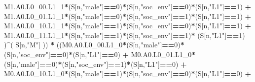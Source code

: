 \documentclass[
]{book}
\newenvironment{Shaded}{\begin{snugshade}}{\end{snugshade}}
\newcommand{\DecValTok}[1]{\textcolor[rgb]{0.00,0.00,0.81}{#1}}
\newcommand{\NormalTok}[1]{#1}
\newcommand{\SpecialCharTok}[1]{\textcolor[rgb]{0.81,0.36,0.00}{\textbf{#1}}}
\newcommand{\StringTok}[1]{\textcolor[rgb]{0.31,0.60,0.02}{#1}}
\begin{document}
\begin{Shaded}
\begin{Highlighting}[]
\NormalTok{          M1.A0.L0\_00.L1\_1}\SpecialCharTok{*}\NormalTok{(S[n,}\StringTok{"male"}\NormalTok{]}\SpecialCharTok{==}\DecValTok{0}\NormalTok{)}\SpecialCharTok{*}\NormalTok{(S[n,}\StringTok{"soc\_env"}\NormalTok{]}\SpecialCharTok{==}\DecValTok{0}\NormalTok{)}\SpecialCharTok{*}\NormalTok{(S[n,}\StringTok{"L1"}\NormalTok{]}\SpecialCharTok{==}\DecValTok{1}\NormalTok{) }\SpecialCharTok{+}
\NormalTok{          M1.A0.L0\_01.L1\_1}\SpecialCharTok{*}\NormalTok{(S[n,}\StringTok{"male"}\NormalTok{]}\SpecialCharTok{==}\DecValTok{0}\NormalTok{)}\SpecialCharTok{*}\NormalTok{(S[n,}\StringTok{"soc\_env"}\NormalTok{]}\SpecialCharTok{==}\DecValTok{1}\NormalTok{)}\SpecialCharTok{*}\NormalTok{(S[n,}\StringTok{"L1"}\NormalTok{]}\SpecialCharTok{==}\DecValTok{1}\NormalTok{) }\SpecialCharTok{+}
\NormalTok{          M1.A0.L0\_10.L1\_1}\SpecialCharTok{*}\NormalTok{(S[n,}\StringTok{"male"}\NormalTok{]}\SpecialCharTok{==}\DecValTok{1}\NormalTok{)}\SpecialCharTok{*}\NormalTok{(S[n,}\StringTok{"soc\_env"}\NormalTok{]}\SpecialCharTok{==}\DecValTok{0}\NormalTok{)}\SpecialCharTok{*}\NormalTok{(S[n,}\StringTok{"L1"}\NormalTok{]}\SpecialCharTok{==}\DecValTok{1}\NormalTok{) }\SpecialCharTok{+}
\NormalTok{          M1.A0.L0\_11.L1\_1}\SpecialCharTok{*}\NormalTok{(S[n,}\StringTok{"male"}\NormalTok{]}\SpecialCharTok{==}\DecValTok{1}\NormalTok{)}\SpecialCharTok{*}\NormalTok{(S[n,}\StringTok{"soc\_env"}\NormalTok{]}\SpecialCharTok{==}\DecValTok{1}\NormalTok{)}\SpecialCharTok{*}
\NormalTok{          (S[n,}\StringTok{"L1"}\NormalTok{]}\SpecialCharTok{==}\DecValTok{1}\NormalTok{) )}\SpecialCharTok{\^{}}\NormalTok{( S[n,}\StringTok{"M"}\NormalTok{] )) }\SpecialCharTok{*}
\NormalTok{      ((M0.A0.L0\_00.L1\_0}\SpecialCharTok{*}\NormalTok{(S[n,}\StringTok{"male"}\NormalTok{]}\SpecialCharTok{==}\DecValTok{0}\NormalTok{)}\SpecialCharTok{*}\NormalTok{(S[n,}\StringTok{"soc\_env"}\NormalTok{]}\SpecialCharTok{==}\DecValTok{0}\NormalTok{)}\SpecialCharTok{*}\NormalTok{(S[n,}\StringTok{"L1"}\NormalTok{]}\SpecialCharTok{==}\DecValTok{0}\NormalTok{) }\SpecialCharTok{+}               
\NormalTok{          M0.A0.L0\_01.L1\_0}\SpecialCharTok{*}\NormalTok{(S[n,}\StringTok{"male"}\NormalTok{]}\SpecialCharTok{==}\DecValTok{0}\NormalTok{)}\SpecialCharTok{*}\NormalTok{(S[n,}\StringTok{"soc\_env"}\NormalTok{]}\SpecialCharTok{==}\DecValTok{1}\NormalTok{)}\SpecialCharTok{*}\NormalTok{(S[n,}\StringTok{"L1"}\NormalTok{]}\SpecialCharTok{==}\DecValTok{0}\NormalTok{) }\SpecialCharTok{+}
\NormalTok{          M0.A0.L0\_10.L1\_0}\SpecialCharTok{*}\NormalTok{(S[n,}\StringTok{"male"}\NormalTok{]}\SpecialCharTok{==}\DecValTok{1}\NormalTok{)}\SpecialCharTok{*}\NormalTok{(S[n,}\StringTok{"soc\_env"}\NormalTok{]}\SpecialCharTok{==}\DecValTok{0}\NormalTok{)}\SpecialCharTok{*}\NormalTok{(S[n,}\StringTok{"L1"}\NormalTok{]}\SpecialCharTok{==}\DecValTok{0}\NormalTok{) }\SpecialCharTok{+} 

\end{Highlighting}
\end{Shaded}
\end{document}
